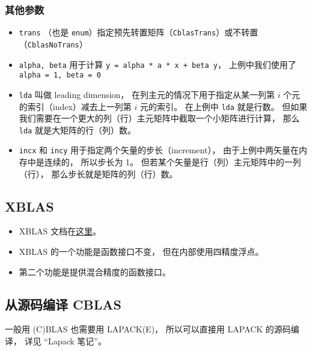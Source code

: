 \subsubsection{其他参数}
\begin{itemize}
\item \verb|trans| （也是 \verb|enum|）指定预先转置矩阵（\verb|CblasTrans|）或不转置（\verb|CblasNoTrans|）
\item \verb|alpha, beta| 用于计算 \verb|y = alpha * a * x + beta y|， 上例中我们使用了 \verb|alpha = 1, beta = 0|
\item \verb|lda| 叫做 leading dimension， 在列主元的情况下用于指定从某一列第 $i$ 个元的索引（index）减去上一列第 $i$ 元的索引。 在上例中 \verb|lda| 就是行数。 但如果我们需要在一个更大的列（行）主元矩阵中截取一个小矩阵进行计算， 那么 \verb|lda| 就是大矩阵的行（列）数。
\item \verb|incx| 和 \verb|incy| 用于指定两个矢量的步长（increment）， 由于上例中两矢量在内存中是连续的， 所以步长为 1。 但若某个矢量是行（列）主元矩阵中的一列（行）， 那么步长就是矩阵的列（行）数。
\end{itemize}

\subsection{XBLAS}
\begin{itemize}
\item XBLAS 文档在\href{https://netlib.org/xblas/}{这里}。
\item XBLAS 的一个功能是函数接口不变， 但在内部使用四精度浮点。
\item 第二个功能是提供混合精度的函数接口。
\end{itemize}

\subsection{从源码编译 CBLAS}
一般用 (C)BLAS 也需要用 LAPACK(E)， 所以可以直接用 LAPACK 的源码编译， 详见 “Lapack 笔记”。

